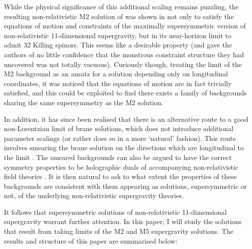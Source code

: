 \documentclass[11pt]{article}
\numberwithin{equation}{section}
\begin{document}
While the physical significance of this additional scaling remains puzzling, the resulting non-relativistic M2 solution of \cite{Lambert:2024uue} was shown in \cite{Bergshoeff:2024nin} not only to satisfy the equations of motion and constraints of the maximally supersymmetric version of non-relativistic 11-dimensional supergravity, but in its near-horizon limit to admit 32 Killing spinors.
This seems like a desirable property (and gave the authors of \cite{Bergshoeff:2024nin} no little confidence that the monstrous constraint structure they had uncovered was not totally vacuous).
Curiously though, treating the limit of the M2 background as an ansatz for a solution depending only on longitudinal coordinates, it was noticed that the equations of motion are in fact trivially satisfied, and this could be exploited to find there exists a family of backgrounds sharing the same supersymmetry as the M2 solution.

In addition, it has since been realised that there is an alternative route to a good non-Lorentzian limit of brane solutions, which does not introduce additional parameter scalings (or rather does so in a more `natural' fashion).
This route involves smearing the brane solution on the directions which are longitudinal to the limit \cite{Blair:2024aqz, Lambert:2024ncn,Harmark:2025ikv}.
The smeared backgrounds can also be argued to have the correct symmetry properties to be holographic duals of accompanying non-relativistic field theories \cite{Lambert:2024ncn}.
It is then natural to ask to what extent the properties of these backgrounds are consistent with them appearing as solutions, supersymmetric or not, of the underlying non-relativistic supergravity theories. 

\vspace{0.5em}
\noindent 
It follows that supersymmetric solutions of non-relativistic 11-dimensional supergravity warrant further attention.
In this paper, I will study the solutions that result from taking limits of the M2 and M5 supergravity solutions.
The results and structure of this paper are summarised below:
\end{document}
